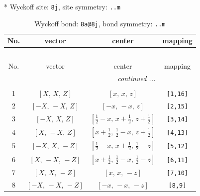 \documentclass[fleqn,8pt]{jsarticle}
\begin{document}
* Wyckoff site: {\tt 8j}, site symmetry: {\tt ..m}
\renewcommand{\arraystretch}{1.2}
\begin{longtable}{cccc}
\caption{Wyckoff bond: {\tt 8a@8j}, bond symmetry: {\tt ..m}}
 \\
 \hline \hline
No. & vector & center & mapping \\ \hline \endfirsthead

\multicolumn{3}{l}{\tablename\ \thetable{}} \\
 \hline \hline
No. & vector & center & mapping \\ \hline \endhead

 \hline \hline
\multicolumn{3}{r}{\footnotesize\it continued ...} \\ \endfoot

 \hline \hline
\multicolumn{3}{r}{} \\ \endlastfoot

1 & $\left[ X,\, X,\, Z \right]$ & $\left[ x,\, x,\, z \right]$ & {\tt [1,16]} \\ \hline
2 & $\left[ - X,\, - X,\, Z \right]$ & $\left[ - x,\, - x,\, z \right]$ & {\tt [2,15]} \\ \hline
3 & $\left[ - X,\, X,\, Z \right]$ & $\left[ \frac{1}{2} - x,\, x + \frac{1}{2},\, z + \frac{1}{2} \right]$ & {\tt [3,14]} \\ \hline
4 & $\left[ X,\, - X,\, Z \right]$ & $\left[ x + \frac{1}{2},\, \frac{1}{2} - x,\, z + \frac{1}{2} \right]$ & {\tt [4,13]} \\ \hline
5 & $\left[ - X,\, X,\, - Z \right]$ & $\left[ \frac{1}{2} - x,\, x + \frac{1}{2},\, \frac{1}{2} - z \right]$ & {\tt [5,12]} \\ \hline
6 & $\left[ X,\, - X,\, - Z \right]$ & $\left[ x + \frac{1}{2},\, \frac{1}{2} - x,\, \frac{1}{2} - z \right]$ & {\tt [6,11]} \\ \hline
7 & $\left[ X,\, X,\, - Z \right]$ & $\left[ x,\, x,\, - z \right]$ & {\tt [7,10]} \\ \hline
8 & $\left[ - X,\, - X,\, - Z \right]$ & $\left[ - x,\, - x,\, - z \right]$ & {\tt [8,9]} \\
\end{longtable}
\renewcommand{\arraystretch}{1.2}
\end{document}

